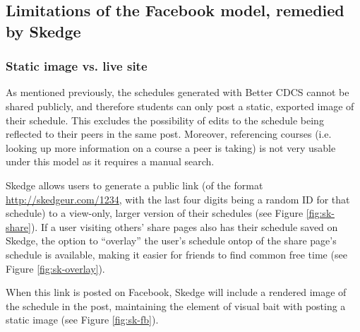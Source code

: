 \subsection{Limitations of the Facebook model, remedied by Skedge}

  \subsubsection{Static image vs. live site}

    As mentioned previously, the schedules generated with Better CDCS cannot be shared publicly, and therefore students can only post a static, exported image of their schedule. This excludes the possibility of edits to the schedule being reflected to their peers in the same post. Moreover, referencing courses (i.e. looking up more information on a course a peer is taking) is not very usable under this model as it requires a manual search.

    Skedge allows users to generate a public link (of the format \url{http://skedgeur.com/1234}, with the last four digits being a random ID for that schedule) to a view-only, larger version of their schedules (see Figure \ref{fig:sk-share}). If a user visiting others' share pages also has their schedule saved on Skedge, the option to ``overlay'' the user's schedule ontop of the share page's schedule is available, making it easier for friends to find common free time (see Figure \ref{fig:sk-overlay}).

    When this link is posted on Facebook, Skedge will include a rendered image of the schedule in the post, maintaining the element of visual bait with posting a static image (see Figure \ref{fig:sk-fb}).

